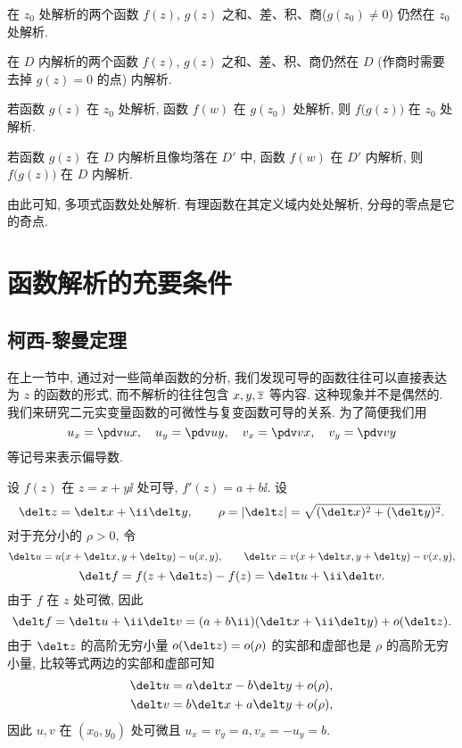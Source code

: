 \begin{theorem}
  \begin{enuma}
    \item 在 $z_0$ 处解析的两个函数 $f(z)$, $g(z)$ 之和、差、积、商($g(z_0)\neq 0$) 仍然在 $z_0$ 处解析.
    \item 在 $D$ 内解析的两个函数 $f(z)$, $g(z)$ 之和、差、积、商仍然在 $D$ (作商时需要去掉 $g(z)=0$ 的点) 内解析.
    \item 若函数 $g(z)$ 在 $z_0$ 处解析, 函数 $f(w)$ 在 $g(z_0)$ 处解析, 则 $f\bigl(g(z)\bigr)$ 在 $z_0$ 处解析.\footnotemark
    \item 若函数 $g(z)$ 在 $D$ 内解析且像均落在 $D'$ 中, 函数 $f(w)$ 在 $D'$ 内解析, 则 $f\bigl(g(z)\bigr)$ 在 $D$ 内解析.
  \end{enuma}
\end{theorem}

由此可知, 多项式函数处处解析. 有理函数在其定义域内处处解析, 分母的零点是它的奇点.



\section{函数解析的充要条件}

\subsection{柯西-黎曼定理}

在上一节中, 通过对一些简单函数的分析, 我们发现可导的函数往往可以直接表达为 $z$ 的函数的形式, 而不解析的往往包含 $x,y,\overline z$ 等内容.
这种现象并不是偶然的.
我们来研究二元实变量函数的可微性与复变函数可导的关系.
为了简便我们用
\[
  u_x=\pdv ux,\quad
  u_y=\pdv uy,\quad
  v_x=\pdv vx,\quad
  v_y=\pdv vy
\]
等记号来表示偏导数.

设 $f(z)$ 在 $z=x+y\ii$ 处可导, $f'(z)=a+b\ii$.
设
\[
  \delt z=\delt x+\ii\delt y,\qquad
  \rho=|\delt z|=\sqrt{(\delt x)^2+(\delt y)^2}.
\]
对于充分小的 $\rho>0$, 令
\[
  \delt u=u(x+\delt x,y+\delt y)-u(x,y),\qquad
  \delt v=v(x+\delt x,y+\delt y)-v(x,y),
\]
\[
   \delt f
  =f(z+\delt z)-f(z)
  =\delt u+\ii\delt v.
\]
由于 $f$ 在 $z$ 处可微, 因此
\[
   \delt f
  =\delt u+\ii\delt v
  =(a+b\ii)(\delt x+\ii\delt y)+o(\delt z).
\]
由于 $\delt z$ 的高阶无穷小量 $o(\delt z)=o(\rho)$ 的实部和虚部也是 $\rho$ 的高阶无穷小量, 比较等式两边的实部和虚部可知
\begin{align*}
  \delt u&=a\delt x-b\delt y+o(\rho),\\
  \delt v&=b\delt x+a\delt y+o(\rho),
\end{align*}
因此 $u,v$ 在 $(x_0,y_0)$ 处可微且 $u_x=v_y=a,v_x=-u_y=b$.

